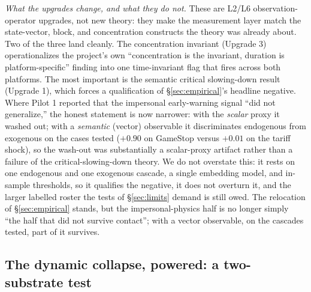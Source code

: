 \documentclass[11pt]{article}
\begin{document}
\emph{What the upgrades change, and what they do not.} These are L2/L6 observation-operator upgrades, not new theory: they make the measurement layer match the state-vector, block, and concentration constructs the theory was already about. Two of the three land cleanly. The concentration invariant (Upgrade 3) operationalizes the project's own ``concentration is the invariant, duration is platform-specific'' finding into one time-invariant flag that fires across both platforms. The most important is the semantic critical slowing-down result (Upgrade 1), which forces a qualification of \S\ref{sec:empirical}'s headline negative. Where Pilot 1 reported that the impersonal early-warning signal ``did not generalize,'' the honest statement is now narrower: with the \emph{scalar} proxy it washed out; with a \emph{semantic} (vector) observable it discriminates endogenous from exogenous on the cases tested ($+0.90$ on GameStop versus $+0.01$ on the tariff shock), so the wash-out was substantially a scalar-proxy artifact rather than a failure of the critical-slowing-down theory. We do not overstate this: it rests on one endogenous and one exogenous cascade, a single embedding model, and in-sample thresholds, so it qualifies the negative, it does not overturn it, and the larger labelled roster the tests of \S\ref{sec:limits} demand is still owed. The relocation of \S\ref{sec:empirical} stands, but the impersonal-physics half is no longer simply ``the half that did not survive contact''; with a vector observable, on the cascades tested, part of it survives.

\subsection{The dynamic collapse, powered: a two-substrate test}
\label{sec:neffcollapse}
\end{document}
